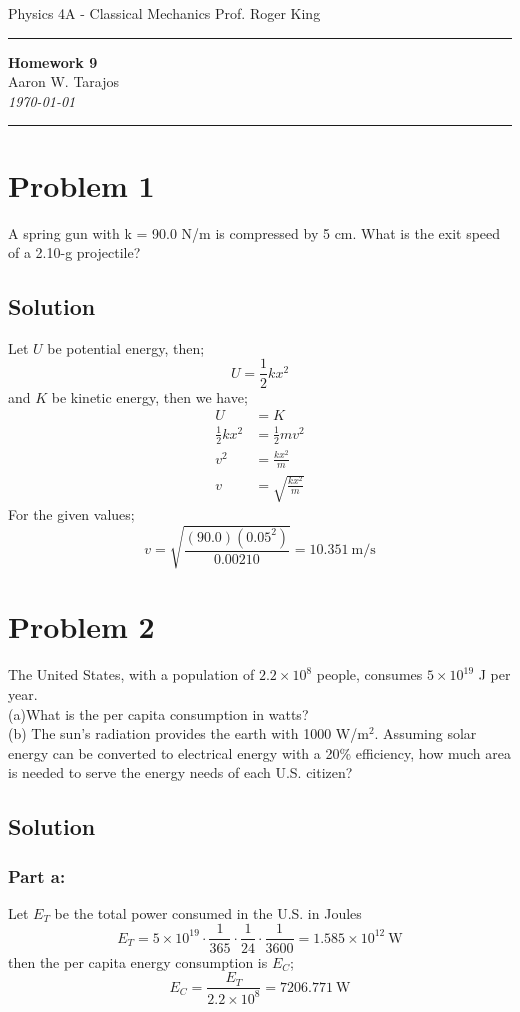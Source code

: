 \documentclass{article}
\begin{document}
\noindent
Physics 4A - Classical Mechanics \hfill Prof. Roger King

\noindent\rule{\textwidth}{0.4pt}

\begin{center}
    \textbf{\LARGE Homework 9} \\
    \vspace{12pt}
    \large Aaron W. Tarajos \\
    \textit{\today}
\end{center}

\noindent\rule{\textwidth}{0.4pt}

\section*{Problem 1}
A spring gun with k = 90.0 N/m is compressed by 5 cm. What is the exit speed of a 2.10-g projectile?

\subsection*{Solution}
Let $U$ be potential energy, then;
\[
	U = \frac{1}{2} kx^2
\]
and $K$ be kinetic energy, then we have;
\begin{align*}
	U &= K \\
	\frac{1}{2}kx^2 &= \frac{1}{2}mv^2 \\
	v^2 &= \frac{kx^2}{m} \\
	v &= \sqrt{\frac{kx^2}{m}}
\end{align*}
For the given values;
\[
	v = \sqrt{\frac{(90.0)(0.05^2)}{0.00210}} = \boxed{10.351\ \text{m}/\text{s}}
\]

\section*{Problem 2}
The United States, with a population of $2.2 \times 10^8$ people, consumes $5 \times 10^{19}$ J per year. \\
(a)What is the per capita consumption in watts? \\
(b) The sun's radiation provides the earth with 1000 W/m$^2$.
Assuming solar energy can be converted to electrical energy with a 20\% efficiency,
how much area is needed to serve the energy needs of each U.S. citizen?

\subsection*{Solution}
\subsubsection*{Part a:}
Let $E_T$ be the total power consumed in the U.S. in Joules
\[
	E_T = 5 \times 10^{19} \cdot \frac{1}{365} \cdot \frac{1}{24} \cdot \frac{1}{3600} = 1.585 \times 10^{12}\ \text{W}
\]
then the per capita energy consumption is $E_C$;
\[
	E_C = \frac{E_T}{2.2 \times 10^8} = \boxed{7206.771\ \text{W}}
\]
\end{document}
